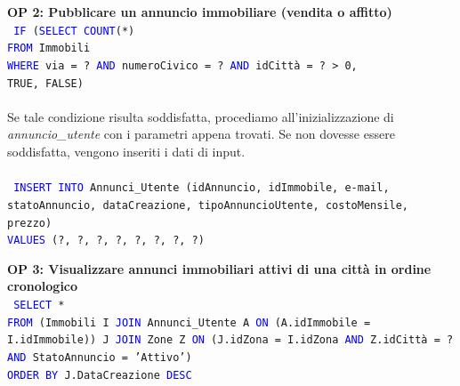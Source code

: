 \documentclass[a4paper,12pt]{report}
\begin{document}
            \noindent
            \textbf{OP 2: Pubblicare un annuncio immobiliare (vendita o affitto)} \\
            \texttt{
                \textcolor{blue}{IF} (\textcolor{blue}{SELECT} \textcolor{blue}{COUNT}(*) \\
                \null\quad\quad\textcolor{blue}{FROM} Immobili \\
                \null\quad\quad\textcolor{blue}{WHERE} via = ? \textcolor{blue}{AND} numeroCivico = ? \textcolor{blue}{AND} idCittà = ? > 0, \\
                \null\quad\quad TRUE, FALSE)  \\
            } \\
            Se tale condizione risulta soddisfatta, procediamo all'inizializzazione di \textit{annuncio\_utente} con i
            parametri appena trovati. Se non dovesse essere soddisfatta, vengono inseriti i dati di input. \\ \\
            \texttt{
                \textcolor{blue}{INSERT INTO} Annunci\_Utente (idAnnuncio, idImmobile, e-mail, statoAnnuncio, dataCreazione, tipoAnnuncioUtente, costoMensile, prezzo) \\
                \textcolor{blue}{VALUES} (?, ?, ?, ?, ?, ?, ?, ?) \\
            }

            \noindent
            \textbf{OP 3: Visualizzare annunci immobiliari attivi di una città in ordine cronologico} \\
            \texttt{
                \textcolor{blue}{SELECT} * \\
                \textcolor{blue}{FROM} (Immobili I \textcolor{blue}{JOIN} Annunci\_Utente A \textcolor{blue}{ON} (A.idImmobile = I.idImmobile)) J \textcolor{blue}{JOIN} Zone Z \textcolor{blue}{ON} (J.idZona = I.idZona \textcolor{blue}{AND} Z.idCittà = ? \textcolor{blue}{AND} StatoAnnuncio = 'Attivo') \\
                \textcolor{blue}{ORDER BY} J.DataCreazione  \textcolor{blue}{DESC} \\
            }
\end{document}
